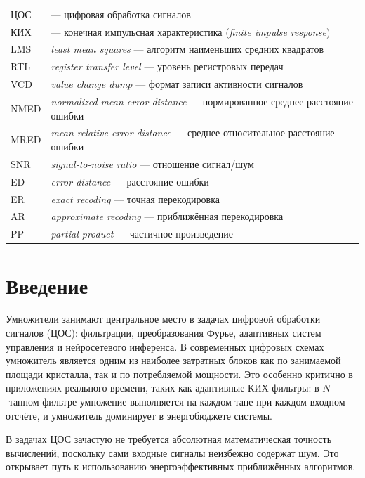 \documentclass[a4paper, 12pt, oneside]{report}
\begin{document}
\begin{tabular}{@{}l >{\raggedright\arraybackslash}p{14cm}@{}}
  ЦОС     & --- цифровая обработка сигналов \\
  КИХ     & --- конечная импульсная характеристика (\textit{finite impulse response}) \\
  LMS     & \textit{least mean squares} --- алгоритм наименьших средних квадратов \\
  RTL     & \textit{register transfer level} --- уровень регистровых передач \\
  VCD     & \textit{value change dump} --- формат записи активности сигналов \\
  NMED    & \textit{normalized mean error distance} --- нормированное среднее расстояние ошибки \\
  MRED    & \textit{mean relative error distance} --- среднее относительное расстояние ошибки \\
  SNR     & \textit{signal-to-noise ratio} --- отношение сигнал/шум \\
  ED      & \textit{error distance} --- расстояние ошибки \\
  ER      & \textit{exact recoding} --- точная перекодировка \\
  AR      & \textit{approximate recoding} --- приближённая перекодировка \\
  PP      & \textit{partial product} --- частичное произведение \\
\end{tabular}

\chapter*{Введение}

Умножители занимают центральное место в задачах цифровой обработки
сигналов (ЦОС): фильтрации, преобразования Фурье, адаптивных систем
управления и нейросетевого инференса. В современных цифровых схемах
умножитель является одним из наиболее затратных блоков как по занимаемой
площади кристалла, так и по потребляемой мощности. Это особенно
критично в приложениях реального времени, таких как адаптивные
КИХ-фильтры: в $N$-тапном фильтре умножение выполняется на каждом тапе
при каждом входном отсчёте, и умножитель доминирует в
энергобюджете системы.

В задачах ЦОС зачастую не требуется абсолютная математическая точность
вычислений, поскольку сами входные сигналы неизбежно содержат шум. Это
открывает путь к использованию энергоэффективных приближённых
алгоритмов.
\end{document}
